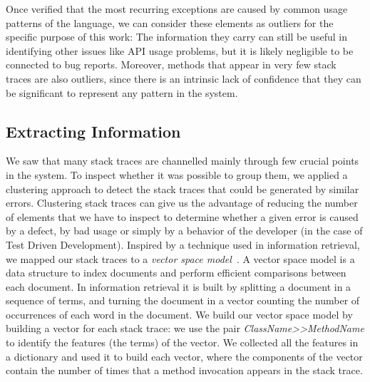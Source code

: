 Once verified that the most recurring exceptions are caused by common usage patterns of the language, we can consider these elements as outliers for the specific purpose of this work: The information they carry can still be useful in identifying other issues like API usage problems, but it is likely negligible to be connected to bug reports.
Moreover, methods that appear in very few stack traces are also outliers, since there is an intrinsic lack of confidence that they can be significant to represent any pattern in the system.

\subsection{Extracting Information}

We saw that many stack traces are channelled mainly through few crucial points in the system.
To inspect whether it was possible to group them, we applied a clustering approach to detect the stack traces that could be generated by similar errors.
Clustering stack traces can give us the advantage of reducing the number of elements that we have to inspect to determine whether a given error is caused by a defect, by bad usage or simply by a behavior of the developer (\eg in the case of Test Driven Development).
Inspired by a technique used in information retrieval, we mapped our stack traces to a \textit{vector space model}~\cite{salt1975}.
A vector space model is a data structure to index documents and perform efficient comparisons between each document.
In information retrieval it is built by splitting a document in a sequence of terms, and turning the document in a vector counting the number of occurrences of each word in the document.
We build our vector space model by building a vector for each stack trace: we use the pair \textit{ClassName{>}{>}MethodName} to identify the features (the terms) of the vector.
We collected all the features in a dictionary and used it to build each vector, where the components of the vector contain the number of times that a method invocation appears in the stack trace.

